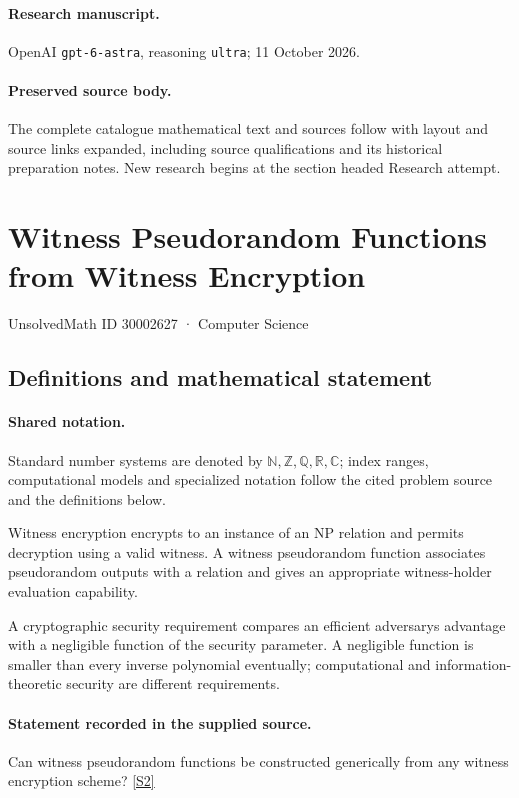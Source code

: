 \documentclass[11pt]{article}
\begin{document}
\paragraph{Research manuscript.} OpenAI \texttt{gpt-6-astra}, reasoning \texttt{ultra}; 11 October 2026.
\paragraph{Preserved source body.} The complete catalogue mathematical text and sources follow with layout and source links expanded, including source qualifications and its historical preparation notes. New research begins at the section headed Research attempt.

\section{Witness Pseudorandom Functions from Witness Encryption}\label{30002627}
{\small UnsolvedMath ID 30002627 · Computer Science}
\subsection{Definitions and mathematical statement}

\paragraph{Shared notation.}Standard number systems are denoted by $\mathbb N,\mathbb Z,\mathbb Q,\mathbb R,\mathbb C$; index ranges, computational models and specialized notation follow the cited problem source and the definitions below.


Witness encryption encrypts to an instance of an NP relation and permits decryption using a valid witness. A witness pseudorandom function associates pseudorandom outputs with a relation and gives an appropriate witness-holder evaluation capability.

A cryptographic security requirement compares an efficient adversary\textquotesingle s advantage with a negligible function of the security parameter. A negligible function is smaller than every inverse polynomial eventually; computational and information-theoretic security are different requirements.
\paragraph{Statement recorded in the supplied source.}
Can witness pseudorandom functions be constructed generically from any witness encryption scheme? \href{https://doi.org/10.4171/owr/2014/35}{[S2]}
\end{document}
